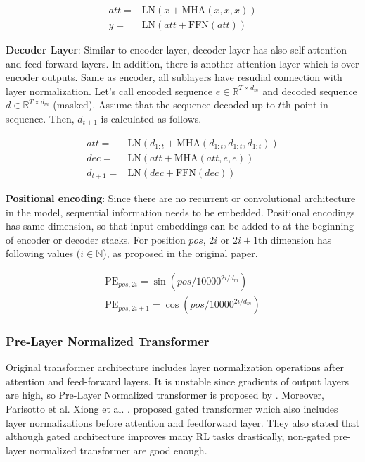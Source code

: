 \begin{equation}
\begin{split}
att = & \mathrm{LN}(x+ \mathrm{MHA}(x,x,x)) \\
y = & \mathrm{LN}(att+ \mathrm{FFN}(att))
\end{split}
\end{equation}

\textbf{Decoder Layer}: Similar to encoder layer, decoder layer has also self-attention and feed forward layers. In addition, there is another attention layer which is over encoder outputs. Same as encoder, all sublayers have resudial connection with layer normalization. Let's call encoded sequence $e \in \mathbb{R}^{T \times d_m}$ and decoded sequence $d \in \mathbb{R}^{T \times d_m}$ (masked). Assume that the sequence decoded up to $t$th point in sequence. Then, $d_{t+1}$ is calculated as follows.

\begin{equation}
\begin{split}
att = & \mathrm{LN}(d_{1:t}+\mathrm{MHA}(d_{1:t},d_{1:t},d_{1:t})) \\
dec = & \mathrm{LN}(att+ \mathrm{MHA}(att,e,e)) \\
d_{t+1} = & \mathrm{LN}(dec+ \mathrm{FFN}(dec))
\end{split}
\end{equation}

\textbf{Positional encoding}: Since there are no recurrent or convolutional architecture in the model, sequential information needs to be embedded. Positional encodings has same dimension, so that input embeddings can be added to at the beginning of encoder or decoder stacks. For position $pos$, $2i$ or $2i+1$th dimension has following values ($i \in \mathbb{N}$), as proposed in the original paper.

\begin{equation}
\begin{split}
\mathrm{PE}_{pos,2i} = \sin(pos/10000^{2i/d_m}) \\
\mathrm{PE}_{pos,2i+1} = \cos(pos/10000^{2i/d_m})
\end{split}
\end{equation}

\subsubsection{Pre-Layer Normalized Transformer}
Original transformer architecture includes layer normalization operations after attention and feed-forward layers. It is unstable since gradients of output layers are high, so Pre-Layer Normalized transformer is proposed by \cite{xiong_layer_2020}. Moreover,  Parisotto et al. Xiong et al. \cite{parisotto_stabilizing_2019}. proposed gated transformer which also includes layer normalizations before attention and feedforward layer. They also stated that although gated architecture improves many RL tasks drastically, non-gated pre-layer normalized transformer are good enough. 

